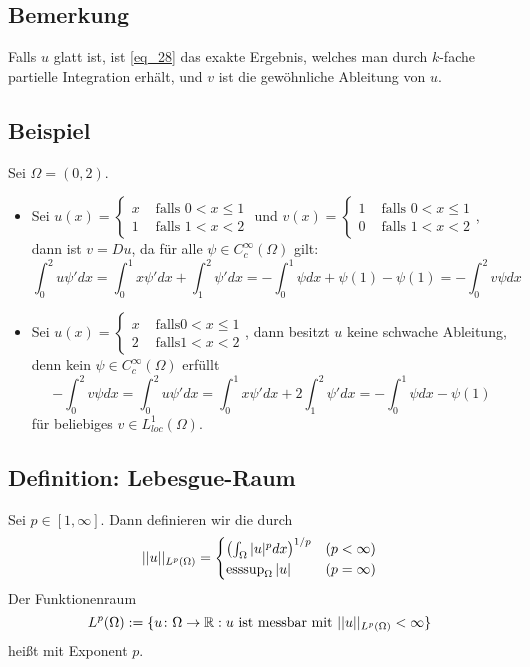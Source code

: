\subsection{Bemerkung}
\label{bem_54}
	Falls $u$ glatt ist, \marginnote{[54]} ist \eqref{eq_28} das exakte Ergebnis, welches man durch $k$-fache partielle Integration erhält, und $v$ ist die gewöhnliche Ableitung von $u$.
	
\subsection{Beispiel}
\label{bsp_55}
	Sei $\Omega = (0,2)$. \marginnote{[55]}
	\begin{itemize}
		\item Sei $u(x) = \begin{cases}
		x & \text{ falls } 0 < x \leq 1 \\
		1 & \text{ falls } 1 < x < 2
		\end{cases}$ und $v(x) = \begin{cases}
		1 & \text{ falls } 0 < x \leq 1 \\
		0 & \text{ falls } 1 < x < 2
		\end{cases}$, dann ist $v = Du$, da für alle $\psi \in C_c^\infty(\Omega)$ gilt:
		\[ \int_0^2 u\psi' dx = \int_0^1 x \psi' dx + \int_1^2 \psi' dx = -\int_0^1 \psi dx + \psi(1) - \psi(1) = -\int_0^2 v\psi dx \]
		\item Sei $u(x) = \begin{cases}
		 x & \text{ falls} 0 < x \leq 1 \\
		 2 & \text{ falls} 1 < x < 2 \end{cases}$, dann besitzt $u$ keine schwache Ableitung, denn kein $\psi \in C_c^\infty(\Omega)$ erfüllt
		 \[ - \int_0^2 v \psi dx = \int_0^2 u \psi' dx = \int_0^1 x \psi'dx + 2 \int_1^2 \psi' dx = -\int_0^1 \psi dx - \psi(1) \]
		 für beliebiges $v \in L_{loc}^1(\Omega)$.
	\end{itemize}
	
\subsection{Definition: Lebesgue-Raum}
\label{def:lebesgue_raum}
	Sei $p \in [1,\infty]$. Dann definieren wir die  durch
	\[ ||u||_{L^p(\Omega)} = \begin{cases}
		\enbrace*{\int_{\Omega} |u|^p dx}^{1/p} & (p < \infty) \\
		\esssup_\Omega |u| & (p = \infty)
	\end{cases} \]
	Der Funktionenraum
	\[ L^p(\Omega) := \{u \colon \Omega \rightarrow \RR : u \text{ ist messbar mit } ||u||_{L^p(\Omega)} < \infty\} \]
	heißt  mit Exponent $p$.
	
